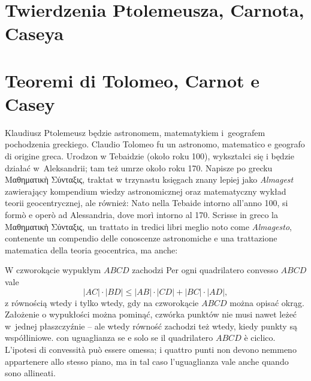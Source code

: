 
%

\section{Twierdzenia Ptolemeusza, Carnota, Caseya} %
\section{Teoremi di Tolomeo, Carnot e Casey} %

Klaudiusz Ptolemeusz będzie astronomem, matematykiem i~geografem pochodzenia greckiego. %
Claudio Tolomeo fu un astronomo, matematico e geografo di origine greca. %
%
Urodzon w Tebaidzie (około roku 100), wykształci się i będzie działać w~Aleksandrii; tam też umrze około roku 170. %
Napisze po grecku Μαθηματικὴ Σύνταξις, traktat w trzynastu księgach znany lepiej jako \emph{Almagest} zawierający kompendium wiedzy astronomicznej oraz matematyczny wykład teorii geocentrycznej, ale również: %
Nato nella Tebaide intorno all'anno 100, si formò e operò ad Alessandria, dove morì intorno al 170. %
Scrisse in greco la Μαθηματικὴ Σύνταξις, un trattato in tredici libri meglio noto come \emph{Almagesto}, contenente un compendio delle conoscenze astronomiche e una trattazione matematica della teoria geocentrica, ma anche: %

\begin{theorem}
[Ptolemeusza, 140 r.n.e.] %
[di Tolomeo, 140 d.C.] %
\label{twierdzenie_ptolemeusza}%
    W czworokącie wypukłym $ABCD$ zachodzi %
    Per ogni quadrilatero convesso $ABCD$ vale %
    \begin{equation}
        |AC| \cdot |BD| \le |AB| \cdot |CD| + |BC| \cdot |AD|,
    \end{equation}
    z równością wtedy i tylko wtedy, gdy na czworokącie $ABCD$ można opisać okrąg. %
    Założenie o wypukłości można pominąć, czwórka punktów nie musi nawet leżeć w~jednej płaszczyźnie -- ale wtedy równość zachodzi też wtedy, kiedy punkty są współliniowe. %
    con uguaglianza se e solo se il quadrilatero $ABCD$ è ciclico. %
    L'ipotesi di convessità può essere omessa; i quattro punti non devono nemmeno appartenere allo stesso piano, ma in tal caso l'uguaglianza vale anche quando sono allineati. %
\end{theorem}

